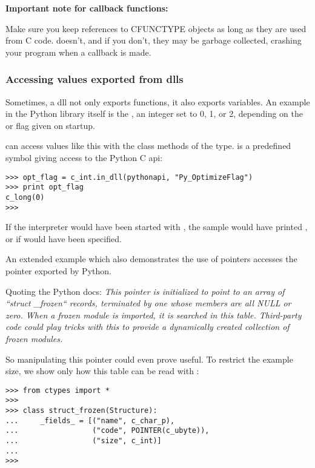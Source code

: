 \textbf{Important note for callback functions:}

Make sure you keep references to CFUNCTYPE objects as long as they are
used from C code.  doesn't, and if you don't, they may be
garbage collected, crashing your program when a callback is made.


\subsubsection{Accessing values exported from dlls\label{ctypes-accessing-values-exported-from-dlls}}

Sometimes, a dll not only exports functions, it also exports
variables. An example in the Python library itself is the
, an integer set to 0, 1, or 2, depending on the
 or  flag given on startup.

 can access values like this with the  class
methods of the type.   is a predefined symbol giving
access to the Python C api:
\begin{verbatim}
>>> opt_flag = c_int.in_dll(pythonapi, "Py_OptimizeFlag")
>>> print opt_flag
c_long(0)
>>>
\end{verbatim}

If the interpreter would have been started with , the sample
would have printed , or  if  would have
been specified.

An extended example which also demonstrates the use of pointers
accesses the  pointer exported by Python.

Quoting the Python docs: \emph{This pointer is initialized to point to an
array of ``struct {\_}frozen`` records, terminated by one whose members
are all NULL or zero. When a frozen module is imported, it is searched
in this table. Third-party code could play tricks with this to provide
a dynamically created collection of frozen modules.}

So manipulating this pointer could even prove useful. To restrict the
example size, we show only how this table can be read with
:
\begin{verbatim}
>>> from ctypes import *
>>>
>>> class struct_frozen(Structure):
...     _fields_ = [("name", c_char_p),
...                 ("code", POINTER(c_ubyte)),
...                 ("size", c_int)]
...
>>>
\end{verbatim}


